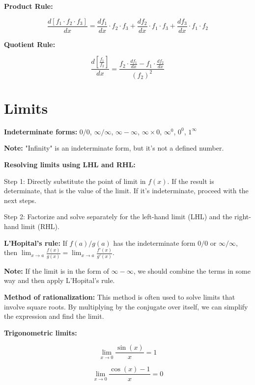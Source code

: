 \documentclass{article}
\begin{document}
\textbf{Product Rule:}

\begin{equation}
\frac{d[f_1 \cdot f_2 \cdot f_3]}{dx} = \frac{df_1}{dx} \cdot f_2 \cdot f_3 + \frac{df_2}{dx} \cdot f_1 \cdot f_3 + \frac{df_3}{dx} \cdot f_1 \cdot f_2
\end{equation}

\textbf{Quotient Rule:}

\begin{equation}
\frac{d\left[\frac{f_1}{f_2}\right]}{dx} = \frac{f_2 \cdot \frac{df_1}{dx} - f_1 \cdot \frac{df_2}{dx}}{(f_2)^2}
\end{equation}

\section{Limits}

\textbf{Indeterminate forms:} $0/0$, $\infty/\infty$, $\infty - \infty$, $\infty \times 0$, $\infty^0$, $0^0$, $1^\infty$

\textbf{Note:} "Infinity" is an indeterminate form, but it's not a defined number.

\textbf{Resolving limits using LHL and RHL:}

Step 1: Directly substitute the point of limit in $f(x)$. If the result is determinate, that is the value of the limit. If it's indeterminate, proceed with the next steps.

Step 2: Factorize and solve separately for the left-hand limit (LHL) and the right-hand limit (RHL).

\textbf{L'Hopital's rule:} If $f(a)/g(a)$ has the indeterminate form $0/0$ or $\infty/\infty$, then $\lim_{x \to a} \frac{f(x)}{g(x)} = \lim_{x \to a} \frac{f'(x)}{g'(x)}$.

\textbf{Note:} If the limit is in the form of $\infty - \infty$, we should combine the terms in some way and then apply L'Hopital's rule.

\textbf{Method of rationalization:} This method is often used to solve limits that involve square roots. By multiplying by the conjugate over itself, we can simplify the expression and find the limit.

\textbf{Trigonometric limits:}

\begin{equation}
\lim_{x \to 0} \frac{\sin(x)}{x} = 1
\end{equation}

\begin{equation}
\lim_{x \to 0} \frac{\cos(x) - 1}{x} = 0
\end{equation}
\end{document}
